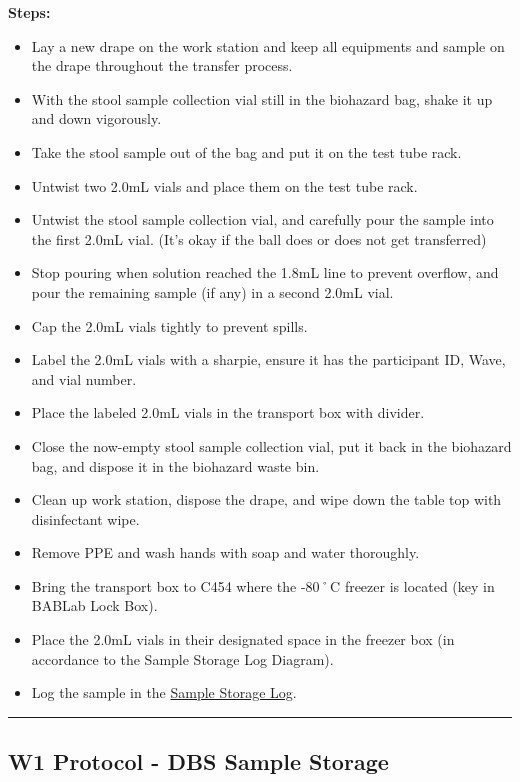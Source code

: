\documentclass[]{book}
\providecommand{\tightlist}{%
  \setlength{\itemsep}{0pt}\setlength{\parskip}{0pt}}
\begin{document}
\textbf{Steps:}

\begin{itemize}
\tightlist
\item
  Lay a new drape on the work station and keep all equipments and sample on the drape throughout the transfer process.
\item
  With the stool sample collection vial still in the biohazard bag, shake it up and down vigorously.
\item
  Take the stool sample out of the bag and put it on the test tube rack.
\item
  Untwist two 2.0mL vials and place them on the test tube rack.
\item
  Untwist the stool sample collection vial, and carefully pour the sample into the first 2.0mL vial. (It's okay if the ball does or does not get transferred)
\item
  Stop pouring when solution reached the 1.8mL line to prevent overflow, and pour the remaining sample (if any) in a second 2.0mL vial.
\item
  Cap the 2.0mL vials tightly to prevent spills.
\item
  Label the 2.0mL vials with a sharpie, ensure it has the participant ID, Wave, and vial number.
\item
  Place the labeled 2.0mL vials in the transport box with divider.
\item
  Close the now-empty stool sample collection vial, put it back in the biohazard bag, and dispose it in the biohazard waste bin.
\item
  Clean up work station, dispose the drape, and wipe down the table top with disinfectant wipe.
\item
  Remove PPE and wash hands with soap and water thoroughly.
\item
  Bring the transport box to C454 where the -80˚C freezer is located (key in BABLab Lock Box).
\item
  Place the 2.0mL vials in their designated space in the freezer box (in accordance to the Sample Storage Log Diagram).
\item
  Log the sample in the \href{https://app.box.com/file/630322897864}{Sample Storage Log}.
\end{itemize}

\begin{center}\rule{0.5\linewidth}{0.5pt}\end{center}

\hypertarget{w1-protocol---dbs-sample-storage}{%
\subsection{W1 Protocol - DBS Sample Storage}\label{w1-protocol---dbs-sample-storage}}
\end{document}
